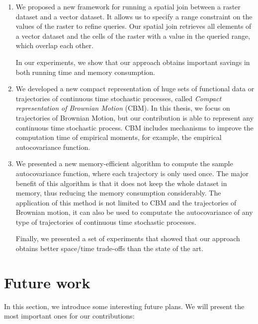\begin{enumerate}
		\item We proposed a new framework for  running a spatial join between a raster dataset  and a vector dataset. It allows us to specify a range constraint on the values of the raster to refine queries. Our spatial join retrieves all elements of a vector dataset and the cells of the  raster with a value in the queried range, which overlap each other. 
		
		In our experiments, we show that our approach obtains important savings in both running time and memory consumption.		

		\item We developed a new compact representation of huge sets of functional data or trajectories of continuous time stochastic processes, called \textit{Compact representation of Brownian Motion} (CBM). In this thesis, we focus on trajectories of Brownian Motion, but our contribution is able to represent any continuous time stochastic process. CBM includes mechanisms to improve the computation time of empirical moments, for example, the empirical autocovariance function. 

		\item We presented a new memory-efficient algorithm to compute the sample autocovariance function, where each trajectory is only used once. The major benefit of this algorithm is that it does not keep the whole dataset in memory, thus reducing the memory consumption considerably. The application of this method is not limited  to CBM and the trajectories of Brownian motion, it can also be used to computate the autocovariance of any type of trajectories of continuous time stochastic processes.
		
		Finally, we presented a set of experiments that showed that our approach obtains better  space/time trade-offs than the state of the art.
	\end{enumerate}

\section{Future work}
In this section, we introduce some interesting future plans. We will present the most important ones for our contributions:

